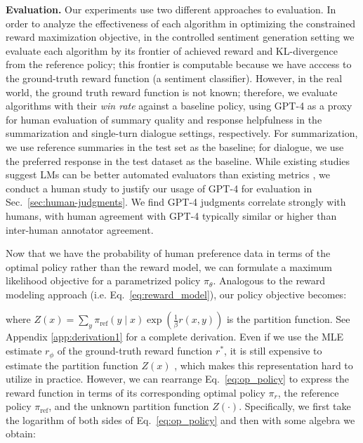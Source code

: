 \textbf{Evaluation.} Our experiments use two different approaches to evaluation. In order to analyze the effectiveness of each algorithm in optimizing the constrained reward maximization objective, in the controlled sentiment generation setting we evaluate each algorithm by its frontier of achieved reward and KL-divergence from the reference policy; this frontier is computable because we have acccess to the ground-truth reward function (a sentiment classifier). However, in the real world, the ground truth reward function is not known; therefore, we evaluate algorithms with their \textit{win rate} against a baseline policy, using GPT-4 as a proxy for human evaluation of summary quality and response helpfulness in the summarization and single-turn dialogue settings, respectively. For summarization, we use reference summaries in the test set as the baseline; for dialogue, we use the preferred response in the test dataset as the baseline. While existing studies suggest LMs can be better automated evaluators than existing metrics \citep{Chen2023ExploringTU}, we conduct a human study to justify our usage of GPT-4 for evaluation in Sec.~\ref{sec:human-judgments}. We find GPT-4 judgments correlate strongly with humans, with human agreement with GPT-4 typically similar or higher than inter-human annotator agreement. 

Now that we have the probability of human preference data in terms of the optimal policy rather than the reward model, we can formulate a maximum likelihood objective for a parametrized policy $\pi_\theta$. Analogous to the reward modeling approach (i.e. Eq.~\ref{eq:reward_model}), our policy objective becomes:

\label{sec:theory}

where $Z(x) =\sum_{y}\pi_\text{ref}(y\mid x)\exp\left(\frac{1}{\beta}r(x, y)\right)$ is the partition function. See Appendix \ref{app:derivation1} for a complete derivation. Even if we use the MLE estimate $r_{\phi}$ of the ground-truth reward function $r^*$, it is still expensive to estimate the partition function $Z(x)$ \citep{korbak2022reinforcement, go2023aligning}, which makes this representation hard to utilize in practice. However, we can rearrange Eq.~\ref{eq:op_policy} to express the reward function in terms of its corresponding optimal policy $\pi_r$, the reference policy $\pi_\text{ref}$, and the unknown partition function $Z(\cdot)$. Specifically, we first take the logarithm of both sides of Eq.~\ref{eq:op_policy} and then with some algebra we obtain:

